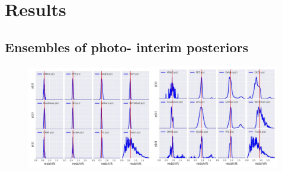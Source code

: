 \section{Results}
\label{sec:results}

\subsection{Ensembles of photo- interim posteriors}

\begin{figure}
\includegraphics[width=0.49\textwidth]{fig/pz_12codes_261931_crop.jpg}\includegraphics[width=0.5\textwidth]{fig/pz_12codes_471167_crop.jpg}\\

\end{figure}
